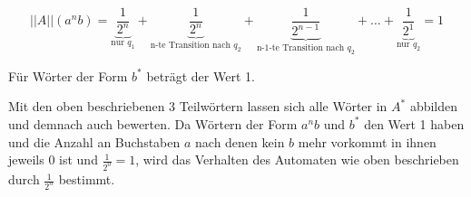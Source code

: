 \documentclass{scrartcl}
\begin{document}
\begin{equation*}
  ||A||(a^nb) = \underbrace{\frac{1}{2^n}}_{\text{nur } q_1} + \underbrace{\frac{1}{2^n}}_{\text{n-te Transition nach } q_2} + \underbrace{\frac{1}{2^{n-1}}}_{\text{n-1-te Transition nach } q_2} + \ldots + \underbrace{\frac{1}{2^1}}_{\text{nur } q_2} = 1
\end{equation*}

Für Wörter der Form $b^*$ beträgt der Wert 1.

Mit den oben beschriebenen 3 Teilwörtern lassen sich alle Wörter in $A^*$ abbilden und demnach auch bewerten. Da Wörtern der Form $a^nb$ und $b^*$ den Wert 1 haben und die Anzahl an Buchstaben $a$ nach denen kein $b$ mehr vorkommt in ihnen jeweils 0 ist und $\frac{1}{2^0} = 1$, wird das Verhalten des Automaten wie oben beschrieben durch $\frac{1}{2^n}$ bestimmt.
\end{document}
